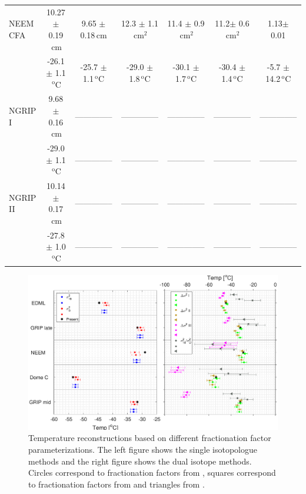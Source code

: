 \documentclass[11pt, draftcls, onecolumn]{IEEEtran} %
\numberwithin{equation}{section}
\numberwithin{table}{section}
\numberwithin{figure}{section}
\begin{document}
\begin{table}[]
\begin{tabular}{l c c c c c c}
		NEEM CFA&10.27 $\pm$ 0.19$\,\mathrm{cm}$& 9.65 $\pm$ 0.18$\,\mathrm{cm}$& 12.3 $\pm$ 1.1$\,\mathrm{cm}^2$& 11.4 $\pm$ 0.9$\,\mathrm{cm}^2$& 11.2$\pm$ 0.6$\,\mathrm{cm}^2$& 1.13$\pm$ 0.01\\
		& -26.1 $\pm$ 1.1$\,^\mathrm{o}$C & -25.7 $\pm$ 1.1$\,^\mathrm{o}$C& -29.0 $\pm$ 1.8$\,^\mathrm{o}$C& -30.1 $\pm$ 1.7$\,^\mathrm{o}$C& -30.4 $\pm$ 1.4$\,^\mathrm{o}$C & -5.7 $\pm$ 14.2$\,^\mathrm{o}$C\\
		
		NGRIP I&9.68 $\pm$ 0.16$\,\mathrm{cm}$& --------------&--------------& --------------&--------------&--------------\\
		& -29.0 $\pm$ 1.1$\,^\mathrm{o}$C & --------------&--------------&-------------- &--------------& --------------\\
		
		NGRIP II &10.14 $\pm$ 0.17$\,\mathrm{cm}$&-------------- &--------------&--------------&-------------- & --------------\\
		& -27.8 $\pm$ 1.0$\,^\mathrm{o}$C & --------------&-------------- &-------------- &-------------- &--------------\\
		\bottomrule	
	\end{tabular}
\end{table}



\begin{figure}[]
	\vspace*{2mm}
	\begin{center}
		\includegraphics[width=\textwidth]{Figure_13}
		\caption{Temperature reconstructions based on
			different fractionation factor parameterizations.
			The left figure shows the single isotopologue methods and 
			the right figure shows the dual isotope methods.
			Circles correspond to fractionation factors from \citet{Majoube1971,Merlivat1967}, 
			squares correspond to fractionation factors from \citet{Ellehoj2013} and  triangles from \citet{Lamb2015,Majoube1971}. }  
		\label{fig:fractionation_temps}
	\end{center}
\end{figure}
\end{document}
